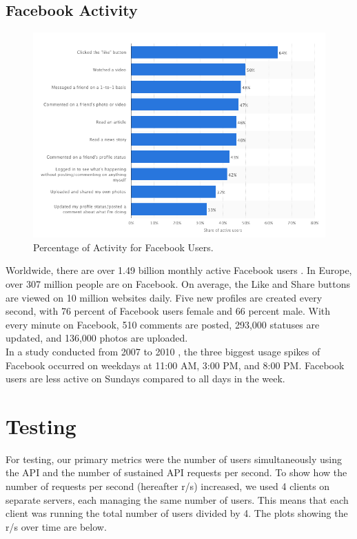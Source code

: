 \documentclass{article}
\begin{document}
\subsection*{Facebook Activity}
\begin{figure}[H]
  \includegraphics[width=\linewidth]{fbact.png}
  \caption{Percentage of Activity for Facebook Users. \cite{fbactwebsite}}
  \label{fig:fbact}
\end{figure}

Worldwide, there are over 1.49 billion monthly active Facebook users \cite{fbstatswebsite}. In Europe, over 307 million people are on Facebook. On average, the Like and Share buttons are viewed on 10 million websites daily. Five new profiles are created every second, with 76 percent of Facebook users female and 66 percent male. With every minute on Facebook, 510 comments are posted, 293,000 statuses are updated, and 136,000 photos are uploaded. \\

\noindent In a study conducted from 2007 to 2010 \cite{fbstats2website}, the three biggest usage spikes of Facebook occurred on weekdays at 11:00 AM, 3:00 PM, and 8:00 PM. Facebook users are less active on Sundays compared to all days in the week.

\section*{Testing}
For testing, our primary metrics were the number of users simultaneously using the API and the number of sustained API requests per second. To show how the number of requests per second (hereafter r/s) increased, we used 4 clients on separate servers, each managing the same number of users. This means that each client was running the total number of users divided by 4. The plots showing the r/s over time are below.
\end{document}
